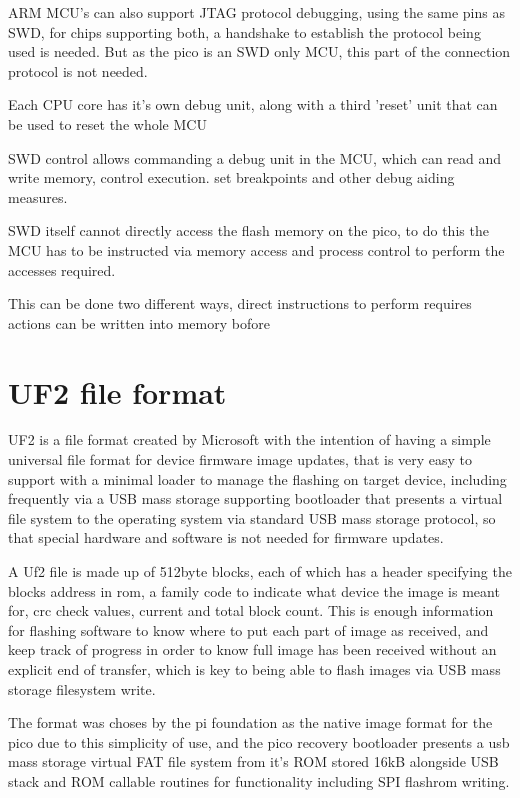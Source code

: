 ARM MCU's can also support JTAG protocol debugging, using the same pins as SWD, for chips supporting both, a handshake to establish the protocol being used is needed. But as the pico is an SWD only MCU, this part of the connection protocol is not needed.

Each CPU core has it's own debug unit, along with a third 'reset' unit that can be used to reset the whole MCU

SWD  control allows commanding a debug unit in the MCU, which can read and write memory, control execution. set breakpoints and other debug aiding measures.

SWD itself cannot directly access the flash memory on the pico, to do this the MCU has to be instructed via memory access and process control to perform the accesses required.

This can be done two different ways, direct instructions to perform requires actions can be written into memory
bofore
\pagebreak
\section{UF2 file format}
UF2 is a file format created by Microsoft with the intention of having a simple universal file format for device firmware image updates, that is very easy to support with a minimal loader to manage the flashing on target device, including frequently via a USB mass storage supporting bootloader that presents a virtual file system to the operating system via standard USB mass storage protocol, so that special hardware and software is not needed for firmware updates.


A Uf2 file is made up of 512byte blocks, each of which has a header specifying the blocks address in rom, a family code to indicate what device the image is meant for, crc check values, current and total block count. This is enough information for flashing software to know where to put each part of image as received, and keep track of progress in order to know full image has been received without an explicit end of transfer, which is key to being able to flash images via USB mass storage filesystem write.

The format was choses by the pi foundation as the native image format for the pico due to this simplicity of use, and the pico recovery bootloader presents a usb mass storage virtual FAT file system from it's ROM stored 16kB alongside USB stack and ROM callable routines for functionality including SPI flashrom writing.

